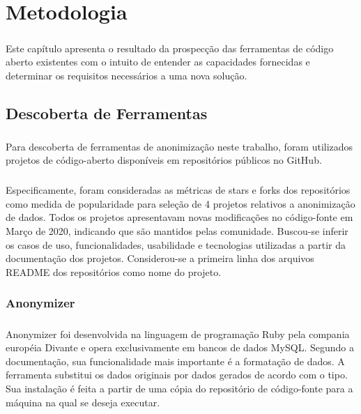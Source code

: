 \chapter{Metodologia}
\label{cap3}

\paragraph{} Este capítulo apresenta o resultado da prospecção das ferramentas de código aberto existentes com o intuito de entender as capacidades fornecidas e determinar os requisitos necessários a uma nova solução.

\section{Descoberta de Ferramentas}

\paragraph{}
Para descoberta de ferramentas de anonimização neste trabalho, foram utilizados projetos de código-aberto disponíveis em repositórios públicos no GitHub. 

\paragraph{}
Especificamente, foram consideradas as métricas de stars e forks dos repositórios como medida de popularidade para seleção de 4 projetos relativos a anonimização de dados. Todos os projetos apresentavam novas modificações no código-fonte em Março de 2020, indicando que são mantidos pelas comunidade. Buscou-se inferir os casos de uso, funcionalidades, usabilidade e tecnologias utilizadas a partir da documentação dos projetos. Considerou-se a primeira linha dos arquivos README dos repositórios como nome do projeto.

\subsection{Anonymizer}

\paragraph{} Anonymizer\cite{Anonymizer} foi desenvolvida na linguagem de programação Ruby pela compania européia Divante e opera exclusivamente em bancos de dados MySQL. Segundo a documentação, sua funcionalidade mais importante é a formatação de dados. A ferramenta substitui os dados originais por dados gerados de acordo com o tipo. Sua instalação é feita a partir de uma cópia do repositório de código-fonte para a máquina na qual se deseja executar.

